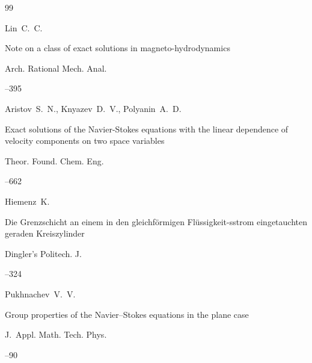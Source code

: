 \begin{thebibliography}{99}

\by Lin~C.~C.

\paper Note on a class of exact solutions in magneto-hydrodynamics

\jour Arch. Rational Mech. Anal.




–395



\moreref 





\by Aristov~S.~N., Knyazev~D.~V., Polyanin~A.~D.

\paper Exact solutions of the Navier-Stokes equations with the linear dependence of velocity components on two space variables

\jour Theor. Found. Chem. Eng.




--662






\by Hiemenz~K.

\paper Die Grenzschicht an einem in den gleichf\"ormigen Fl\"ussigkeit-sstrom eingetauchten geraden Kreiszylinder

\jour Dingler’s Politech. J.



–324




\by Pukhnachev~V.~V.

\paper Group properties of the Navier–Stokes equations in the plane case

\jour J.~Appl. Math. Tech. Phys.



--90






\end{thebibliography}
